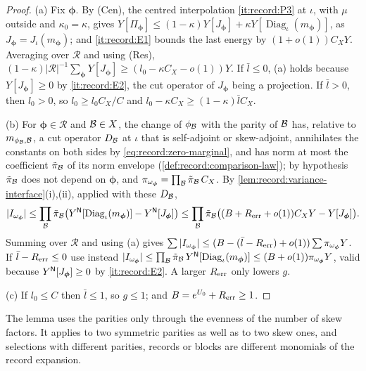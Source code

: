 \begin{proof}
(a) Fix $\boldsymbol\phi$. By (Cen), the centred interpolation \ref{it:record:P3}
at $\iota$, with $\mu$ outside and $\kappa_0=\kappa$, gives
$Y[\Pi_{\boldsymbol\phi}]\le(1-\kappa)Y[J_{\boldsymbol\phi}]+
\kappa Y[\operatorname{Diag}_\iota(m_{\boldsymbol\phi})]$, as
$J_{\boldsymbol\phi}=J_\iota(m_{\boldsymbol\phi})$; and \ref{it:record:E1} bounds
the last energy by $(1+o(1))C_XY$. Averaging over $\mathcal R$ and using (Res),
$(1-\kappa)|\mathcal R|^{-1}\sum_{\boldsymbol\phi}Y[J_{\boldsymbol\phi}]\ge
(l_0-\kappa C_X-o(1))Y$. If $\bar l\le0$, (a) holds because
$Y[J_{\boldsymbol\phi}]\ge0$ by \ref{it:record:E2}, the cut operator of
$J_{\boldsymbol\phi}$ being a projection. If $\bar l>0$, then $l_0>0$, so
$l_0\ge l_0C_X/C$ and $l_0-\kappa C_X\ge(1-\kappa)\bar lC_X$.

(b) For $\boldsymbol\phi\in\mathcal R$ and $\mathcal B\in X$, the change of $\phi_\mathcal B$
with the parity of $\mathcal B$ has, relative to $m_{\phi_\mathcal B,\mathcal B}$, a cut operator
$D_\mathcal B$ at $\iota$ that is self-adjoint or skew-adjoint, annihilates the
constants on both sides by \eqref{eq:record:zero-marginal}, and has norm at most
the coefficient $\tilde\pi_\mathcal B$ of its norm envelope (\cref{def:record:comparison-law});
by hypothesis $\tilde\pi_\mathcal B$ does not depend on $\boldsymbol\phi$, and
$\pi_{\omega_{\boldsymbol\phi}}=\prod_\mathcal B\tilde\pi_\mathcal B\,C_X$. By
\cref{lem:record:variance-interface}(i),(ii), applied with these $D_\mathcal B$,
\[
 |I_{\omega_{\boldsymbol\phi}}|\le\prod_\mathcal B\tilde\pi_\mathcal B\bigl(
 Y^{\mathsf N}[\operatorname{Diag}_\iota(m_{\boldsymbol\phi})]-
 Y^{\mathsf N}[J_{\boldsymbol\phi}]\bigr)
 \le\prod_\mathcal B\tilde\pi_\mathcal B\bigl((B+R_{\rm err}+o(1))C_XY
 -Y[J_{\boldsymbol\phi}]\bigr).
\]
Summing over $\mathcal R$ and using (a) gives
$\sum|I_{\omega_{\boldsymbol\phi}}|\le(B-(\bar l-R_{\rm err})+o(1))
\sum\pi_{\omega_{\boldsymbol\phi}}Y$. If $\bar l-R_{\rm err}\le0$ use instead
$|I_{\omega_{\boldsymbol\phi}}|\le\prod_\mathcal B\tilde\pi_\mathcal B\,
Y^{\mathsf N}[\operatorname{Diag}_\iota(m_{\boldsymbol\phi})]\le(B+o(1))
\pi_{\omega_{\boldsymbol\phi}}Y$, valid because $Y^{\mathsf N}[J_{\boldsymbol\phi}]\ge0$
by \ref{it:record:E2}. A larger $R_{\rm err}$ only lowers $g$.

(c) If $l_0\le C$ then $\bar l\le1$, so $g\le1$; and
$B=e^{U_0}+R_{\rm err}\ge1$.
\end{proof}

The lemma uses the parities only through the evenness of the number of skew
factors. It applies to two symmetric parities as well as to two skew ones, and
selections with different parities, records or blocks are different monomials
of the record expansion.


